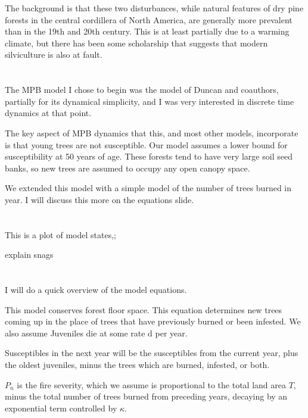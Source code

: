 \documentclass{article}
\begin{document}
The background is that these two disturbances, while natural features of dry pine forests in the central cordillera of North America, are generally more prevalent than in the 19th and 20th century. This is at least partially due to a warming climate, but there has been some scholarship that suggests that modern silviculture is also at fault. 


\section{}

The MPB model I chose to begin was the model of Duncan and coauthors, partially for its dynamical simplicity, and I was very interested in discrete time dynamics at that point.

The key aspect of MPB dynamics that this, and most other models, incorporate is that young trees are not susceptible. Our model assumes a lower bound for susceptibility at 50 years of age. These forests tend to have very large soil seed banks, so new trees are assumed to occupy any open canopy space.  

We extended this model with a simple model of the number of trees burned in year. I will discuss this more on the equations slide.
\section{}

This is a plot of model states,;

explain snags

\section{}

I will do a quick overview of the model equations.

This model conserves forest floor space. This equation determines new trees coming up in the place of trees that have previously burned or been infested. We also assume Juveniles die at some rate d per year. 

Susceptibles in the next year will be the susceptibles from the current year, plus the oldest juveniles, minus the trees which are burned, infested, or both.


$P_n$ is the fire severity, which we assume is proportional to the total land area $T$, minus the total number of trees burned from preceding years, decaying by an exponential term controlled by $\kappa$.
\end{document}
